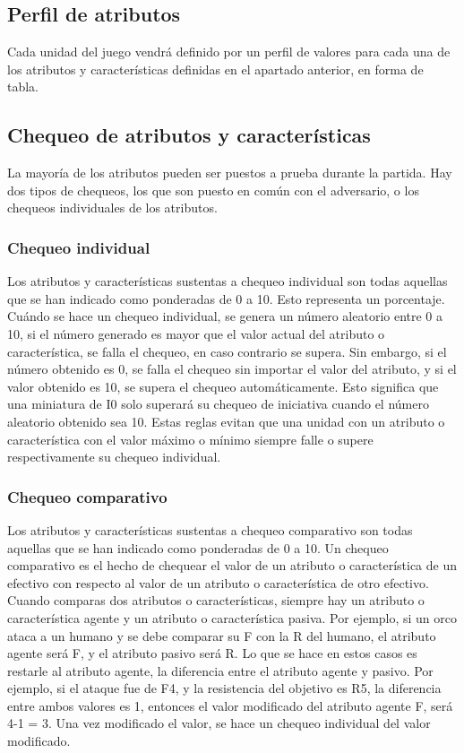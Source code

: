 \subsection*{Perfil de atributos}
Cada unidad del juego vendrá definido por un perfil de valores para cada una de los atributos y características definidas en el apartado anterior, en forma de tabla.

\subsection*{Chequeo de atributos y características}
\label{chequeo}
La mayoría de los atributos pueden ser puestos a prueba durante la partida. Hay dos tipos de chequeos, los que son puesto en común con el adversario, o los chequeos individuales de los atributos.

\subsubsection*{Chequeo individual}
Los atributos y características sustentas a chequeo individual son todas aquellas que se han indicado como ponderadas de 0 a 10. Esto representa un porcentaje. Cuándo se hace un chequeo individual, se genera un número aleatorio entre 0 a 10, si el número generado es mayor que el valor actual del atributo o característica, se falla el chequeo, en caso contrario se supera. Sin embargo, si el número obtenido es 0, se falla el chequeo sin importar el valor del atributo, y si el valor obtenido es 10, se supera el chequeo automáticamente. Esto significa que una miniatura de I0 solo superará su chequeo de iniciativa cuando el número aleatorio obtenido sea 10. Estas reglas evitan que una unidad con un atributo o característica con el valor máximo o  mínimo siempre falle o supere respectivamente su chequeo individual.

\subsubsection*{Chequeo comparativo}
Los atributos y características sustentas a chequeo comparativo son todas aquellas que se han indicado como ponderadas de 0 a 10. Un chequeo comparativo es el hecho de chequear el valor de un atributo o característica de un efectivo con respecto al valor de un atributo o característica de otro efectivo. Cuando comparas dos atributos o características, siempre hay un atributo o característica agente y un atributo o característica pasiva. Por ejemplo, si un orco ataca a un humano y se debe comparar su F con la R del humano, el atributo agente será F, y el atributo pasivo será R. Lo que se hace en estos casos es restarle al atributo agente, la diferencia entre el atributo agente y pasivo. Por ejemplo, si el ataque fue de F4, y la resistencia del objetivo es R5, la diferencia entre ambos valores es 1, entonces el valor modificado del atributo agente F, será 4-1 = 3. Una vez modificado el valor, se hace un chequeo individual del valor modificado.


